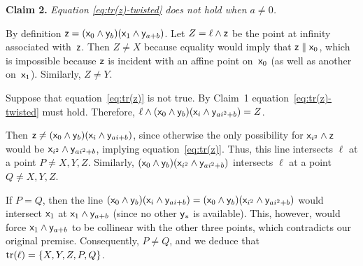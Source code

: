 \begin{solution}
\begin{description}
        \medskip

        \textbf{Claim 2.} \textit{Equation\/ {\upshape\ref{eq:tr(z)-twisted}} does not hold when\/ $a\ne0$.}

        By definition $\mathsf z=(\mathsf x_0\wedge\mathsf y_b)(\mathsf x_1\wedge\mathsf y_{a+b})$. Let $Z=\ell\wedge\mathsf z$ be the point at infinity associated with~$\mathsf z$. Then $Z\ne X$ because equality would imply that $\mathsf z\parallel\mathsf x_0$, which is impossible because $\mathsf z$ is incident with an affine point on~$\mathsf x_0$ (as well as another on~$\mathsf x_1$). Similarly, $Z\ne Y$.

        Suppose that equation~\ref{eq:tr(z)} is not true. By Claim~1 equation~\ref{eq:tr(z)-twisted} must hold. Therefore, $\ell\wedge(\mathsf x_0\wedge\mathsf y_b)(\mathsf x_i\wedge\mathsf y_{ai^2+b})=Z$.
        
        Then $\mathsf z\ne(\mathsf x_0\wedge\mathsf y_b)(\mathsf x_i\wedge\mathsf y_{ai+b})$, since otherwise the only possibility for ${\mathsf x_{i^2}}\wedge\mathsf z$ would be $\mathsf x_{i^2}\wedge\mathsf y_{ai^2+b}$, implying equation~\ref{eq:tr(z)}. Thus, this line intersects $\ell$ at a point $P\ne X,Y,Z$. Similarly, $(\mathsf x_0\wedge\mathsf y_b)(\mathsf x_{i^2}\wedge\mathsf y_{ai^2+b})$ intersects $\ell$ at a point $Q\ne X,Y,Z$.

        If $P=Q$, then the line $(\mathsf x_0\wedge\mathsf y_b)(\mathsf x_i\wedge\mathsf y_{ai+b})=(\mathsf x_0\wedge\mathsf y_b)(\mathsf x_{i^2}\wedge\mathsf y_{ai^2+b})$ would intersect $\mathsf x_1$ at $\mathsf x_1\wedge\mathsf y_{a+b}$ (since no other $\mathsf y_*$ is available). This, however, would force $\mathsf x_1\wedge\mathsf y_{a+b}$ to be collinear with the other three points, which contradicts our original premise. Consequently, 
        $P\ne Q$, and we deduce that $\operatorname{tr}(\ell)=\{X,Y,Z,P,Q\}$.
        

\end{description}
\end{solution}
